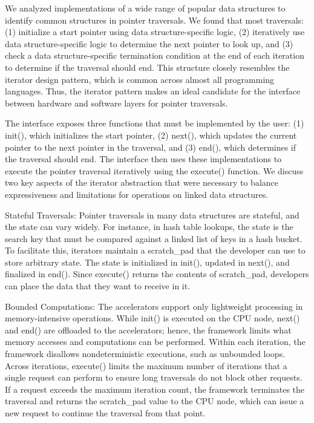 We analyzed implementations of a wide range of popular data structures to identify common structures in pointer traversals. We found that most traversals: (1) initialize a start pointer using data structure-specific logic, (2) iteratively use data structure-specific logic to determine the next pointer to look up, and (3) check a data structure-specific termination condition at the end of each iteration to determine if the traversal should end. This structure closely resembles the iterator design pattern, which is common across almost all programming languages. Thus, the iterator pattern makes an ideal candidate for the interface between hardware and software layers for pointer traversals.

The interface exposes three functions that must be implemented by the user: (1) init(), which initializes the start pointer, (2) next(), which updates the current pointer to the next pointer in the traversal, and (3) end(), which determines if the traversal should end. The interface then uses these implementations to execute the pointer traversal iteratively using the execute() function. We discuss two key aspects of the iterator abstraction that were necessary to balance expressiveness and limitations for operations on linked data structures.

Stateful Traversals: Pointer traversals in many data structures are stateful, and the state can vary widely. For instance, in hash table lookups, the state is the search key that must be compared against a linked list of keys in a hash bucket. To facilitate this, iterators maintain a scratch\_pad that the developer can use to store arbitrary state. The state is initialized in init(), updated in next(), and finalized in end(). Since execute() returns the contents of scratch\_pad, developers can place the data that they want to receive in it.

Bounded Computations: The accelerators support only lightweight processing in memory-intensive operations. While init() is executed on the CPU node, next() and end() are offloaded to the accelerators; hence, the framework limits what memory accesses and computations can be performed. Within each iteration, the framework disallows nondeterministic executions, such as unbounded loops. Across iterations, execute() limits the maximum number of iterations that a single request can perform to ensure long traversals do not block other requests. If a request exceeds the maximum iteration count, the framework terminates the traversal and returns the scratch\_pad value to the CPU node, which can issue a new request to continue the traversal from that point.

